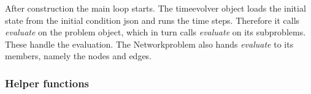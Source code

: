 \documentclass[a4paper]{article}
\begin{document}
After construction the main loop starts.
The timeevolver object loads the initial state from the initial condition json and runs the time steps.
Therefore it calls \emph{evaluate} on the problem object, which in turn calls \emph{evaluate} on its subproblems.
These handle the evaluation. The Networkproblem also hands \emph{evaluate} to its members, namely the nodes and edges.

\subsubsection{Helper functions}%
\label{sec:helper-functions}
\end{document}
